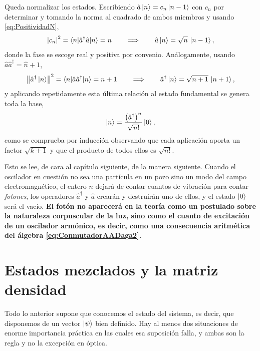         Queda normalizar los estados. Escribiendo $\hat{a}\ket{n} = c_{n}\ket{n-1}$ con $c_{n}$ por determinar y tomando la norma al cuadrado de ambos miembros y usando \eqref{eq:PositividadN},
        \begin{equation}\label{eq:NormalizacionA}
            \left|c_{n}\right|^{2} = \braket{n|\hat{a}^{\dagger}\hat{a}|n} = n
            \qquad\Longrightarrow\qquad
            \hat{a}\ket{n} = \sqrt{n}\,\ket{n-1},
        \end{equation}
        donde la fase se escoge real y positiva por convenio. Análogamente, usando $\hat{a}\hat{a}^{\dagger} = \hat{n}+1$,
        \begin{equation}\label{eq:NormalizacionADaga}
            \left\|\hat{a}^{\dagger}\ket{n}\right\|^{2} = \braket{n|\hat{a}\hat{a}^{\dagger}|n} = n+1
            \qquad\Longrightarrow\qquad
            \hat{a}^{\dagger}\ket{n} = \sqrt{n+1}\,\ket{n+1},
        \end{equation}
        y aplicando repetidamente esta última relación al estado fundamental se genera toda la base,
        \begin{equation}\label{eq:EstadosNumero}
            \ket{n} = \frac{\left(\hat{a}^{\dagger}\right)^{n}}{\sqrt{n!}}\ket{0},
        \end{equation}
        como se comprueba por inducción observando que cada aplicación aporta un factor $\sqrt{k+1}$ y que el producto de todos ellos es $\sqrt{n!}$.

        Esto se lee, de cara al capítulo siguiente, de la manera siguiente. Cuando el oscilador en cuestión no sea una partícula en un pozo sino un modo del campo electromagnético, el entero $n$ dejará de contar cuantos de vibración para contar \textit{fotones}, los operadores $\hat{a}^{\dagger}$ y $\hat{a}$ crearán y destruirán uno de ellos, y el estado $\ket{0}$ será el vacío. \textbf{El fotón no aparecerá en la teoría como un postulado sobre la naturaleza corpuscular de la luz, sino como el cuanto de excitación de un oscilador armónico, es decir, como una consecuencia aritmética del álgebra \eqref{eq:ConmutadorAADaga2}.}

\section{Estados mezclados y la matriz densidad}

        Todo lo anterior supone que conocemos el estado del sistema, es decir, que disponemos de un vector $\ket{\psi}$ bien definido. Hay al menos dos situaciones de enorme importancia práctica en las cuales esa suposición falla, y ambas son la regla y no la excepción en óptica.

